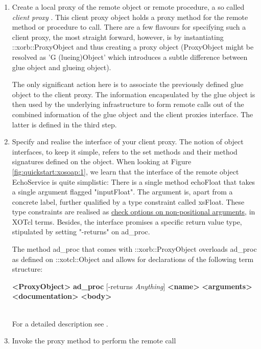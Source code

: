 \begin{enumerate}
\item Create a local proxy of the remote object or remote procedure, a so called \emph{client proxy}
. This client proxy object holds a proxy method for the remote method or procedure to 
call. There are a few flavours for specifying such a client proxy, the most straight forward, however, is by 
instantiating ::xorb::ProxyObject and thus creating a proxy object (ProxyObject might be resolved as 'G
(lueing)Object' which introduces a subtle difference between glue object and glueing object).

The only significant action here is to associate the previously defined glue object to the client proxy. The 
information encapsulated by the glue object is then used by the underlying infrastructure to form remote 
calls out of the combined information of the glue object and the client proxies interface. The latter is 
defined in the third step.
\item Specify and realise the interface of your client proxy. The notion of object interfaces, to keep it 
simple, refers to the set methods and their method signatures defined on the object. When looking at 
Figure \ref{fig:quickstart:xosoap:1}, we learn that the interface of the remote object EchoService is quite 
simplistic: There is a single method echoFloat that takes a single argument flagged "inputFloat". The 
argument is, apart from a concrete label, further qualified by a type constraint called xsFloat. These type 
constraints are realised as \href{http://media.wu-wien.ac.at/doc/tutorial.html#non-pos-args}{check 
options on non-positional arguments}, in XOTcl terms. Besides, the interface promises a specific return 
value type, stipulated by setting "-returns" on ad\_proc.

The method ad\_proc that comes with ::xorb::ProxyObject overloads ad\_proc as defined 
on ::xotcl::Object and allows for declarations of the following term structure: \\\begin{footnotesize}\textbf
{<ProxyObject>} \textbf{ad\_proc} [-returns \textit{Anything}] \textbf{<name>} \textbf{<arguments>} \textbf
{<documentation>} \textbf{<body>}\end{footnotesize}\\
For a detailed description see .
\item Invoke the proxy method to perform the remote call

\end{enumerate}
